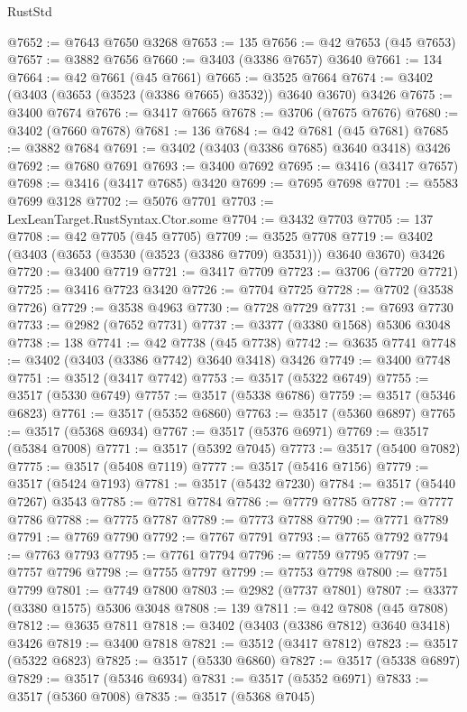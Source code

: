 \begin{lexlean}{RustStd}
\begin{coremodule}
@7652 := @7643 @7650 @3268
@7653 := 135
@7656 := @42 @7653 (@45 @7653)
@7657 := @3882 @7656
@7660 := @3403 (@3386 @7657) @3640
@7661 := 134
@7664 := @42 @7661 (@45 @7661)
@7665 := @3525 @7664
@7674 := @3402 (@3403 (@3653 (@3523 (@3386 @7665) @3532)) @3640 @3670) @3426
@7675 := @3400 @7674
@7676 := @3417 @7665
@7678 := @3706 (@7675 @7676)
@7680 := @3402 (@7660 @7678)
@7681 := 136
@7684 := @42 @7681 (@45 @7681)
@7685 := @3882 @7684
@7691 := @3402 (@3403 (@3386 @7685) @3640 @3418) @3426
@7692 := @7680 @7691
@7693 := @3400 @7692
@7695 := @3416 (@3417 @7657)
@7698 := @3416 (@3417 @7685) @3420
@7699 := @7695 @7698
@7701 := @5583 @7699 @3128
@7702 := @5076 @7701
@7703 := LexLeanTarget.RustSyntax.Ctor.some
@7704 := @3432 @7703
@7705 := 137
@7708 := @42 @7705 (@45 @7705)
@7709 := @3525 @7708
@7719 := @3402 (@3403 (@3653 (@3530 (@3523 (@3386 @7709) @3531))) @3640 @3670) @3426
@7720 := @3400 @7719
@7721 := @3417 @7709
@7723 := @3706 (@7720 @7721)
@7725 := @3416 @7723 @3420
@7726 := @7704 @7725
@7728 := @7702 (@3538 @7726)
@7729 := @3538 @4963
@7730 := @7728 @7729
@7731 := @7693 @7730
@7733 := @2982 (@7652 @7731)
@7737 := @3377 (@3380 @1568) @5306 @3048
@7738 := 138
@7741 := @42 @7738 (@45 @7738)
@7742 := @3635 @7741
@7748 := @3402 (@3403 (@3386 @7742) @3640 @3418) @3426
@7749 := @3400 @7748
@7751 := @3512 (@3417 @7742)
@7753 := @3517 (@5322 @6749)
@7755 := @3517 (@5330 @6749)
@7757 := @3517 (@5338 @6786)
@7759 := @3517 (@5346 @6823)
@7761 := @3517 (@5352 @6860)
@7763 := @3517 (@5360 @6897)
@7765 := @3517 (@5368 @6934)
@7767 := @3517 (@5376 @6971)
@7769 := @3517 (@5384 @7008)
@7771 := @3517 (@5392 @7045)
@7773 := @3517 (@5400 @7082)
@7775 := @3517 (@5408 @7119)
@7777 := @3517 (@5416 @7156)
@7779 := @3517 (@5424 @7193)
@7781 := @3517 (@5432 @7230)
@7784 := @3517 (@5440 @7267) @3543
@7785 := @7781 @7784
@7786 := @7779 @7785
@7787 := @7777 @7786
@7788 := @7775 @7787
@7789 := @7773 @7788
@7790 := @7771 @7789
@7791 := @7769 @7790
@7792 := @7767 @7791
@7793 := @7765 @7792
@7794 := @7763 @7793
@7795 := @7761 @7794
@7796 := @7759 @7795
@7797 := @7757 @7796
@7798 := @7755 @7797
@7799 := @7753 @7798
@7800 := @7751 @7799
@7801 := @7749 @7800
@7803 := @2982 (@7737 @7801)
@7807 := @3377 (@3380 @1575) @5306 @3048
@7808 := 139
@7811 := @42 @7808 (@45 @7808)
@7812 := @3635 @7811
@7818 := @3402 (@3403 (@3386 @7812) @3640 @3418) @3426
@7819 := @3400 @7818
@7821 := @3512 (@3417 @7812)
@7823 := @3517 (@5322 @6823)
@7825 := @3517 (@5330 @6860)
@7827 := @3517 (@5338 @6897)
@7829 := @3517 (@5346 @6934)
@7831 := @3517 (@5352 @6971)
@7833 := @3517 (@5360 @7008)
@7835 := @3517 (@5368 @7045)

\end{coremodule}
\end{lexlean}
